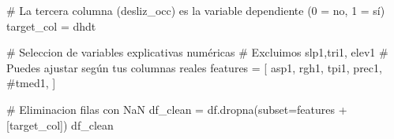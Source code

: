 \documentclass[
  letterpaper,
  DIV=11,
  numbers=noendperiod]{scrartcl}
\newenvironment{Shaded}{\begin{snugshade}}{\end{snugshade}}
\newcommand{\CommentTok}[1]{\textcolor[rgb]{0.37,0.37,0.37}{#1}}
\newcommand{\NormalTok}[1]{\textcolor[rgb]{0.00,0.23,0.31}{#1}}
\newcommand{\OperatorTok}[1]{\textcolor[rgb]{0.37,0.37,0.37}{#1}}
\newcommand{\StringTok}[1]{\textcolor[rgb]{0.13,0.47,0.30}{#1}}
\begin{document}
\begin{Shaded}
\begin{Highlighting}[]
\CommentTok{\# La tercera columna (\textquotesingle{}desliz\_occ\textquotesingle{}) es la variable dependiente (0 = no, 1 = sí)}
\NormalTok{target\_col }\OperatorTok{=} \StringTok{\textquotesingle{}dhdt\textquotesingle{}}

\CommentTok{\# Seleccion de variables explicativas numéricas}
\CommentTok{\# Excluimos \textquotesingle{}slp1\textquotesingle{},\textquotesingle{}tri1\textquotesingle{}, \textquotesingle{}elev1\textquotesingle{}}
\CommentTok{\# Puedes ajustar según tus columnas reales}
\NormalTok{features }\OperatorTok{=}\NormalTok{ [}
    \StringTok{\textquotesingle{}asp1\textquotesingle{}}\NormalTok{, }\StringTok{\textquotesingle{}rgh1\textquotesingle{}}\NormalTok{,  }
    \StringTok{\textquotesingle{}tpi1\textquotesingle{}}\NormalTok{, }\StringTok{\textquotesingle{}prec1\textquotesingle{}}\NormalTok{, }\CommentTok{\#\textquotesingle{}tmed1\textquotesingle{},}
\NormalTok{]}

\CommentTok{\# Eliminacion filas con NaN}
\NormalTok{df\_clean }\OperatorTok{=}\NormalTok{ df.dropna(subset}\OperatorTok{=}\NormalTok{features }\OperatorTok{+}\NormalTok{ [target\_col])}
\NormalTok{df\_clean}
\end{Highlighting}
\end{Shaded}
\end{document}
